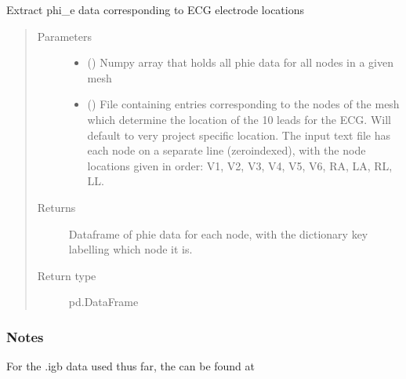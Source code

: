 \documentclass[letterpaper,10pt,english]{sphinxmanual}
\begin{document}
\begin{fulllineitems}
\label{\detokenize{_autosummary/signalanalysis.ecg.get_electrode_phie:signalanalysis.ecg.get_electrode_phie}}
\sphinxAtStartPar
Extract phi\_e data corresponding to ECG electrode locations
\begin{quote}\begin{description}
\item[{Parameters}] \leavevmode\begin{itemize}
\item {} 
\sphinxAtStartPar
{} () \textendash{} Numpy array that holds all phie data for all nodes in a given mesh

\item {} 
\sphinxAtStartPar
{} () \textendash{} File containing entries corresponding to the nodes of the mesh which determine the location of the 10 leads
for the ECG. Will default to very project specific location. The input text file has each node on a separate
line (zero\sphinxhyphen{}indexed), with the node locations given in order: V1, V2, V3, V4, V5, V6, RA, LA, RL,
LL.

\end{itemize}

\item[{Returns}] \leavevmode
\sphinxAtStartPar
{} \textendash{} Dataframe of phie data for each node, with the dictionary key labelling which node it is.

\item[{Return type}] \leavevmode
\sphinxAtStartPar
pd.DataFrame

\end{description}\end{quote}
\subsubsection*{Notes}

\sphinxAtStartPar
For the .igb data used thus far, the  can be found at 

\end{fulllineitems}
\end{document}
